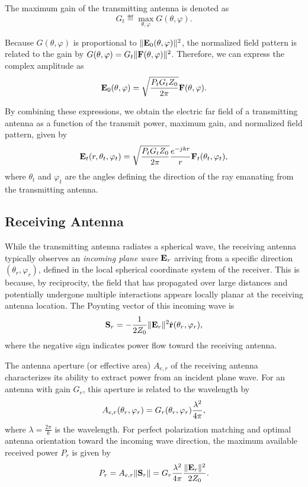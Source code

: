 The maximum gain of the transmitting antenna is denoted as
\begin{equation}
  G_t \eqdef \max_{\theta, \varphi} G(\theta, \varphi).
\end{equation}

Because $G(\theta, \varphi)$ is proportional to $\|\mathbf{E}_0(\theta, \varphi)\|^2$, the normalized field pattern is related to the gain by $G(\theta, \varphi) = G_t \|\mathbf{F}(\theta, \varphi)\|^2$. Therefore, we can express the complex amplitude as
\begin{equation}
  \mathbf{E}_0(\theta, \varphi) = \sqrt{\frac{P_t G_t Z_0}{2\pi}} \mathbf{F}(\theta, \varphi).
\end{equation}

By combining these expressions, we obtain the electric \gls{far field} of a transmitting antenna as a function of the transmit power, maximum gain, and normalized field pattern, given by
\begin{equation}\labeq{transmit-field}
  \bsup{E}_{t}(r, \theta_{t}, \varphi_{t}) = \sqrt{\frac{P_{t} G_{t} Z_0}{2\pi}} \frac{e^{-jkr}}{r} \bsup{F}_{t}(\theta_{t}, \varphi_{t}),
\end{equation}
where $\theta_{t}$ and $\varphi_{t}$ are the angles defining the direction of the ray emanating from the transmitting antenna.

\subsection{Receiving Antenna}

While the transmitting antenna radiates a spherical wave, the receiving antenna typically observes an \emph{incoming plane wave} $\mathbf{E}_{r}$ arriving from a specific direction $(\theta_{r}, \varphi_{r})$, defined in the local spherical coordinate system of the receiver. This is because, by reciprocity, the field that has propagated over large distances and potentially undergone multiple interactions appears locally planar at the receiving antenna location. The Poynting vector of this incoming wave is
\begin{equation}
  \mathbf{S}_{r} = -\frac{1}{2Z_0} \|\mathbf{E}_{r}\|^2 \hat{\mathbf{r}}(\theta_{r}, \varphi_{r}),
\end{equation}
where the negative sign indicates power flow toward the receiving antenna.

The antenna aperture (or effective area) $A_{e,r}$ of the receiving antenna characterizes its ability to extract power from an incident plane wave. For an antenna with gain $G_{r}$, this aperture is related to the \gls{wavelength} by
\begin{equation}\labeq{effective-area}
  A_{e,r}(\theta_{r}, \varphi_{r}) = G_{r}(\theta_{r}, \varphi_{r}) \frac{\lambda^2}{4\pi},
\end{equation}
where $\lambda = \tfrac{2\pi}{k}$ is the \gls{wavelength}. For perfect polarization matching and optimal antenna orientation toward the incoming wave direction, the maximum available received power $P_{r}$ is given by
\begin{equation}
  P_{r} = A_{e,r} \|\mathbf{S}_{r}\| = G_{r} \frac{\lambda^2}{4\pi} \frac{\|\mathbf{E}_{r}\|^2}{2Z_0}.
\end{equation}

